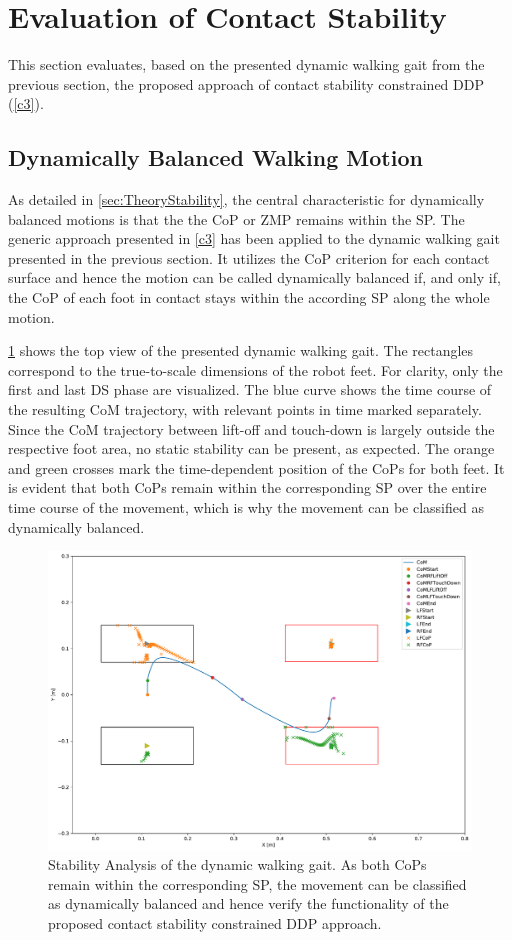 \section{Evaluation of Contact Stability}\label{sec:BipedEvaluation}
This section evaluates, based on the presented dynamic walking gait from the previous section, the proposed approach of contact stability constrained DDP (\cref{c3}).

\subsection{Dynamically Balanced Walking Motion}
As detailed in \cref{sec:TheoryStability}, the central characteristic for dynamically balanced motions is that the the \gls{CoP} or \gls{ZMP} remains within the \gls{SP}. The generic approach presented in \cref{c3} has been applied to the dynamic walking gait presented in the previous section. It utilizes the \gls{CoP} criterion for each contact surface and hence the motion can be called dynamically balanced if, and only if, the \gls{CoP} of each foot in contact stays within the according \gls{SP} along the whole motion. 

\cref{fig:walkDynamic_StabilityCoP100} shows the top view of the presented dynamic walking  gait. The rectangles correspond to the true-to-scale dimensions of the robot feet. For clarity, only the first and last \gls{DS} phase are visualized.  
The blue curve shows the time course of the resulting \gls{CoM} trajectory, with relevant points in time marked separately. Since the \gls{CoM} trajectory between lift-off and touch-down is largely outside the respective foot area, no static stability can be present, as expected. 
The orange and green crosses mark the time-dependent position of the \gls{CoP}s for both feet. It is evident that both \gls{CoP}s remain within the corresponding SP over the entire time course of the movement, which is why the movement can be classified as dynamically balanced. 
\begin{figure}[h!]
\centering	
\includegraphics[width=.8\textwidth]{fig/walkDynamic/StabilityAnalysis_CoP100}
\caption[Stability Analysis of the dynamic walking gait]{Stability Analysis of the dynamic walking gait. As both \gls{CoP}s remain within the corresponding SP, the movement can be classified as dynamically balanced and hence verify the functionality of the proposed contact stability constrained \gls{DDP} approach.}
\label{fig:walkDynamic_StabilityCoP100}
\end{figure} 

